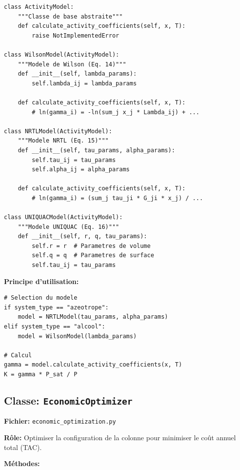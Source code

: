 \documentclass[11pt,a4paper]{article}
\begin{document}
\begin{lstlisting}
class ActivityModel:
    """Classe de base abstraite"""
    def calculate_activity_coefficients(self, x, T):
        raise NotImplementedError

class WilsonModel(ActivityModel):
    """Modele de Wilson (Eq. 14)"""
    def __init__(self, lambda_params):
        self.lambda_ij = lambda_params

    def calculate_activity_coefficients(self, x, T):
        # ln(gamma_i) = -ln(sum_j x_j * Lambda_ij) + ...

class NRTLModel(ActivityModel):
    """Modele NRTL (Eq. 15)"""
    def __init__(self, tau_params, alpha_params):
        self.tau_ij = tau_params
        self.alpha_ij = alpha_params

    def calculate_activity_coefficients(self, x, T):
        # ln(gamma_i) = (sum_j tau_ji * G_ji * x_j) / ...

class UNIQUACModel(ActivityModel):
    """Modele UNIQUAC (Eq. 16)"""
    def __init__(self, r, q, tau_params):
        self.r = r  # Parametres de volume
        self.q = q  # Parametres de surface
        self.tau_ij = tau_params
\end{lstlisting}

\textbf{Principe d'utilisation:}
\begin{lstlisting}
# Selection du modele
if system_type == "azeotrope":
    model = NRTLModel(tau_params, alpha_params)
elif system_type == "alcool":
    model = WilsonModel(lambda_params)

# Calcul
gamma = model.calculate_activity_coefficients(x, T)
K = gamma * P_sat / P
\end{lstlisting}

\subsection{Classe: \texttt{EconomicOptimizer}}

\textbf{Fichier:} \texttt{economic\_optimization.py}

\textbf{Rôle:} Optimiser la configuration de la colonne pour minimiser le coût annuel total (TAC).

\textbf{Méthodes:}
\end{document}
